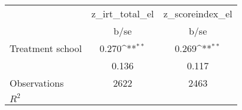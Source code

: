{
\def\sym#1{\ifmmode^{#1}\else\(^{#1}\)\fi}
\begin{tabular}{l*{2}{c}}
\toprule
                    &z\_irt\_total\_el         &z\_scoreindex\_el         \\
                    &        b/se         &        b/se         \\
\midrule
Treatment school    &       0.270\sym{**} &       0.269\sym{**} \\
                    &       0.136         &       0.117         \\
\midrule
Observations        &        2622         &        2463         \\
\(R^{2}\)           &                     &                     \\
\bottomrule
\end{tabular}
}
